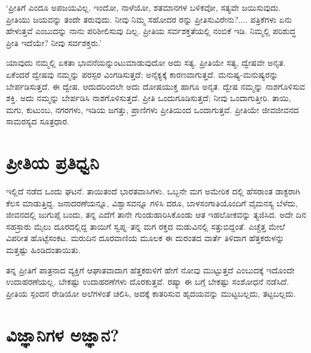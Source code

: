 ‘ಪ್ರೀತಿಗೆ ಎಂದೂ ಅಪಜಯವಿಲ್ಲ. ಇಂದೋ, ನಾಳೆಯೋ, ಶತಮಾನಗಳ ಬಳಿಕವೋ, ಸತ್ಯವೇ ಜಯಿಸುವುದು. ಪ್ರೀತಿಯು ಜಯವನ್ನು ತಂದೇ ತರುವುದು. ನೀವು ನಿಮ್ಮ ಸಹೋದರ ರನ್ನು ಪ್ರೀತಿಸುವಿರೇನು?.... ಪತ್ರಿಕೆಗಳು ಏನು ಹೇಳುತ್ತವೆ ಎಂಬುದನ್ನು ನಾನು ಪರಿಶೀಲಿಸುವು ದಿಲ್ಲ. ಪ್ರೀತಿಯ ಸರ್ವಶಕ್ತತೆಯಲ್ಲಿ ನಂಬಿಕೆ ಇಡಿ. ನಿಮ್ಮಲ್ಲಿ ಪರಿಶುದ್ಧ ಪ್ರೀತಿ ಇದೆಯೇ? ನೀವು ಸರ್ವಶಕ್ತರು.’

ಯಾವುದು ನಮ್ಮಲ್ಲಿ ಏಕತಾ ಭಾವನೆಯನ್ನುಂಟುಮಾಡುವುದೋ ಅದು ಸತ್ಯ. ಪ್ರೀತಿಯೇ ಸತ್ಯ, ದ್ವೇಷವೇ ಅನೃತ. ಏಕೆಂದರೆ ದ್ವೇಷವು ನಮ್ಮನ್ನು ಪರಸ್ಪರ ವಿಂಗಡಿಸುತ್ತದೆ; ಅನೈಕ್ಯಕ್ಕೆ ಕಾರಣವಾಗುತ್ತದೆ. ಮನುಷ್ಯ-ಮನುಷ್ಯರನ್ನು ಬೇರ್ಪಡಿಸುತ್ತದೆ. ಈ ದ್ವೇಷ. ಆದುದರಿಂದಲೇ ಅದು ದೋಷಯುಕ್ತ ಹಾಗೂ ಅನೃತ. ದ್ವೇಷ ನಮ್ಮನ್ನು ನಾಶಗೊಳಿಸುವ ಶಕ್ತಿ. ಅದು ನಮ್ಮನ್ನು ಬೇರ್ಪಡಿಸಿ ನಾಶಗೊಳಿಸುತ್ತದೆ. ಪ್ರೀತಿ ಒಂದುಗೂಡಿಸುತ್ತದೆ; ನೀವು ಒಂದಾಗುತ್ತೀರಿ. ತಾಯಿ, ಮಗು, ಕುಟುಂಬ, ನಗರಗಳು, ಇಡಿಯ ಜಗತ್ತು, ಪ್ರಾಣಿಗಳು ಪ್ರೀತಿಯಿಂದ ಒಂದಾಗುತ್ತವೆ. ಪ್ರೀತಿಯೇ ಜೀವಜೀವನದ ಸಾಮರಸ್ಯದ ಸೂತ್ರಧಾರ.


\section{ಪ್ರೀತಿಯ ಪ್ರತಿಧ್ವನಿ}

ಇಲ್ಲಿದೆ ನಡೆದ ಒಂದು ಘಟನೆ. ತಾಯಿತಂದೆ ಭಾರತವಾಸಿಗಳು. ಒಬ್ಬನೇ ಮಗ ಅಮೇರಿಕ ದಲ್ಲಿ ಹೆಸರಾಂತ ಡಾಕ್ಟರಾಗಿ ಕೆಲಸ ಮಾಡುತ್ತಿದ್ದ. ಜನಾದರಣೆಯನ್ನೂ, ವಿಶ್ವಾಸವನ್ನೂ ಗಳಿಸಿ ದರೂ, ಬಾಳಸಂಗಾತಿಯೊಂದಿಗೆ ವೈಮನಸ್ಯ ಬೆಳೆದು, ಜೀವನದಲ್ಲಿ ಜುಗುಪ್ಸೆ ಬಂದು, ತನ್ನ ಎದೆಗೆ ತಾನೇ ಗುಂಡುಹಾರಿಸಿಕೊಂಡು ಆತ ಇಹಲೋಕವನ್ನು ತ್ಯಜಿಸಿದ. ಅದೇ ದಿನ ಸಹಸ್ರಾರು ಮೈಲು ದೂರದಲ್ಲಿದ್ದ ತಾಯಿಗೆ ಸ್ವಪ್ನ–ತನ್ನ ಮಗ ರಕ್ತದ ಮಡುವಿನಲ್ಲಿ ಸತ್ತುಬಿದ್ದಂತೆ. ಎಚ್ಚೆತ್ತ ಮೇಲೆ ವಿಪರೀತ ಹೊಟ್ಟೆಸಂಕಟ. ಮರುದಿನ ದೂರವಾಣಿಯ ಮೂಲಕ ಈ ದುರಂತದ ವಾರ್ತೆ ತಿಳಿದಾಗ ಹೆತ್ತಕರುಳನ್ನು ಮತ್ತಷ್ಟು ಹಿಂಡಿದಂತಾಯಿತು.

ತನ್ನ ಪ್ರೀತಿಗೆ ಪಾತ್ರನಾದ ವ್ಯಕ್ತಿಗೆ ಆಘಾತವಾದಾಗ ಹೆತ್ತಕರುಳಿಗೆ ಹೇಗೆ ನೋವು ಮುಟ್ಟುತ್ತದೆ ಎಂಬುದಕ್ಕೆ ಇದೊಂದೇ ಉದಾಹರಣೆಯಲ್ಲ. ಬೇಕಷ್ಟು ಉದಾಹರಣೆಗಳು ದೊರಕುತ್ತವೆ. ರಷ್ಯಾ ಈ ಬಗ್ಗೆ ಬೇಕಷ್ಟು ಸಂಶೋಧನೆ ನಡೆಸಿದೆ. ಪ್ರೀತಿಯ ಸ್ಪಂದನ ರೇಡಿಯೋ ಅಲೆಗಳಂತೆ ಚಲಿಸಿ, ಅದಕ್ಕೆ ಕಾತರಿಸುವ ಹೃದಯವನ್ನು ಮುಟ್ಟಬಲ್ಲದು, ತಟ್ಟಬಲ್ಲದು.


\section{ವಿಜ್ಞಾನಿಗಳ ಅಜ್ಞಾನ?}

